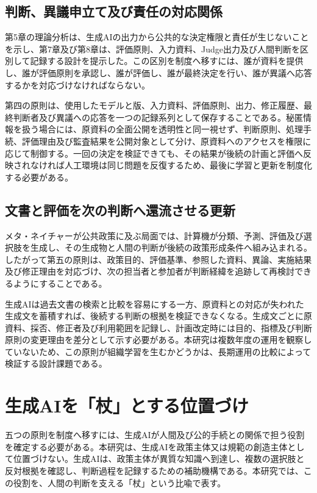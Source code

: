 \subsection{判断、異議申立て及び責任の対応関係}

第5章の理論分析は、生成AIの出力から公共的な決定権限と責任が生じないことを示し、第7章及び第8章は、評価原則、入力資料、Judge出力及び人間判断を区別して記録する設計を提示した。この区別を制度へ移すには、誰が資料を提供し、誰が評価原則を承認し、誰が評価し、誰が最終決定を行い、誰が異議へ応答するかを対応づけなければならない。

第四の原則は、使用したモデルと版、入力資料、評価原則、出力、修正履歴、最終判断者及び異議への応答を一つの記録系列として保存することである。秘匿情報を扱う場合には、原資料の全面公開を透明性と同一視せず、判断原則、処理手続、評価理由及び監査結果を公開対象として分け、原資料へのアクセスを権限に応じて制御する。一回の決定を検証できても、その結果が後続の計画と評価へ反映されなければ人工環境は同じ問題を反復するため、最後に学習と更新を制度化する必要がある。

\subsection{文書と評価を次の判断へ還流させる更新}

メタ・ネイチャーが公共政策に及ぶ局面では、計算機が分類、予測、評価及び選択肢を生成し、その生成物と人間の判断が後続の政策形成条件へ組み込まれる。したがって第五の原則は、政策目的、評価基準、参照した資料、異論、実施結果及び修正理由を対応づけ、次の担当者と参加者が判断経緯を追跡して再検討できるようにすることである。

生成AIは過去文書の検索と比較を容易にする一方、原資料との対応が失われた生成文を蓄積すれば、後続する判断の根拠を検証できなくなる。生成文ごとに原資料、採否、修正者及び利用範囲を記録し、計画改定時には目的、指標及び判断原則の変更理由を差分として示す必要がある。本研究は複数年度の運用を観察していないため、この原則が組織学習を生むかどうかは、長期運用の比較によって検証する設計課題である。

\section{生成AIを「杖」とする位置づけ}
\label{sec:ch9_ai_staff}

五つの原則を制度へ移すには、生成AIが人間及び公的手続との関係で担う役割を確定する必要がある。本研究は、生成AIを政策主体又は規範の創造主体として位置づけない。生成AIは、政策主体が異質な知識へ到達し、複数の選択肢と反対根拠を確認し、判断過程を記録するための補助機構である。本研究では、この役割を、人間の判断を支える「杖」という比喩で表す。

